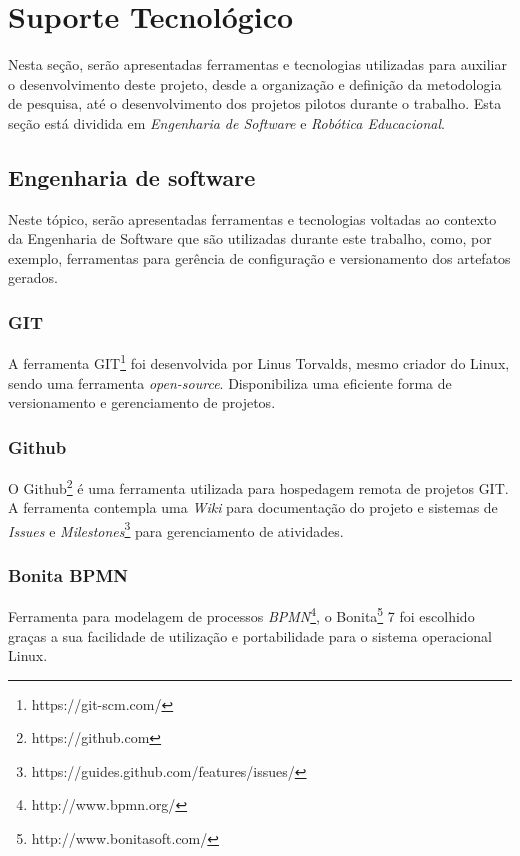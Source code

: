
\chapter[Suporte Tecnológico]{Suporte Tecnológico}

Nesta seção, serão apresentadas ferramentas e tecnologias utilizadas para auxiliar o desenvolvimento deste projeto, desde a organização e definição da metodologia de pesquisa, até o desenvolvimento dos projetos pilotos durante o trabalho. Esta seção está dividida em \textit{Engenharia de Software} e \textit{Robótica Educacional}.

\section{Engenharia de software} %
\label{sec:engenharia_de_software}
	Neste tópico, serão apresentadas ferramentas e tecnologias voltadas ao contexto da Engenharia de Software que são utilizadas durante este trabalho, como, por exemplo, ferramentas para gerência de configuração e versionamento dos artefatos gerados.

	\subsection{GIT} %
	\label{sub:git}
	
		A ferramenta GIT\footnote{https://git-scm.com/} foi desenvolvida por Linus Torvalds, mesmo criador do Linux, sendo uma ferramenta \textit{open-source}. Disponibiliza uma eficiente forma de versionamento e gerenciamento de projetos. 

	\subsection{Github} %
	\label{sub:github}
		O Github\footnote{https://github.com} é uma ferramenta utilizada para hospedagem remota de projetos GIT. A ferramenta contempla uma \textit{Wiki} para documentação do projeto e sistemas de \textit{Issues} e \textit{Milestones}\footnote{https://guides.github.com/features/issues/} para gerenciamento de atividades.

	\subsection{Bonita BPMN} %
	\label{sub:bonita_bpmn}
		Ferramenta para modelagem de processos \textit{BPMN}\footnote{http://www.bpmn.org/}, o Bonita\footnote{http://www.bonitasoft.com/} 7 foi escolhido graças a sua facilidade de utilização e portabilidade para o sistema operacional Linux.

